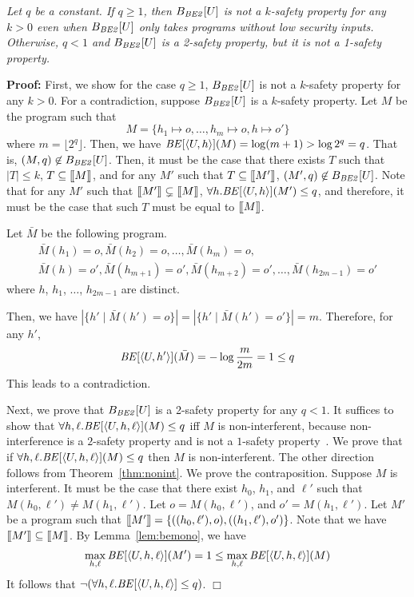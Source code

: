 \documentclass{llncs}
\newenvironment{proof}{\noindent\rm{\bf Proof:}}{\hbox{$\Box$}\vspace*{0.2\baselineskip}}
\newenvironment{reftheorem}[1]{\begin{trivlist}\item[\hskip
      \labelsep{\bf Theorem #1.}]\it}{\end{trivlist}}
\newcommand{\aset}[1]{\{{#1}\}}
\newcommand{\aseq}[1]{\langle#1\rangle}
\newcommand{\sembrack}[1]{[\hspace*{-1.2pt}[#1]\hspace*{-1.2pt}]}
\begin{document}
\begin{reftheorem}{\ref{thm:be2nk1}}
  Let $q$ be a constant.  If $q\ge 1$, then $B_{\it BE2}[U]$ is not a
  $k$-safety property for any $k > 0$ even when $B_{\it BE2}[U]$ only
  takes programs without low security inputs.  Otherwise, $q<1$ and
  $B_{\it BE2}[U]$ is a 2-safety property, but it is not a 1-safety
  property.
\end{reftheorem}
\begin{proof}
First, we show for the case $q \geq 1$, $B_{\it BE2}[U]$ is not a
$k$-safety property for any $k > 0$.  For a contradiction, suppose
$B_{\it BE2}[U]$ is a $k$-safety property.  Let $M$ be the program such
that
\[
M = \aset{h_1 \mapsto o,\dots, h_m \mapsto o,h \mapsto o'}
\]
where $m=\lfloor 2^q\rfloor$.  Then, we have ${\it
  BE}[\aseq{U,h}](M)=\log(m+1)>\log 2^q=q$.  That is, $(M,q)\not\in
B_{\it BE2}[U]$.  Then, it must be the case that there exists $T$ such
that $|T|\le k$, $T\subseteq\sembrack{M}$, and for any $M'$ such that
$T\subseteq \sembrack{M'}$, $(M',q)\not\in B_{\it BE2}[U]$.  Note that
for any $M'$ such that $\sembrack{M'} \subsetneq \sembrack{M}$,
$\forall h.{\it BE}[\aseq{U,h}](M') \leq q$, and therefore, it must be
the case that such $T$ must be equal to $\sembrack{M}$.

Let $\bar{M}$ be the following program.
\[
\begin{array}{l}
  \bar{M}(h_1)=o,
  \bar{M}(h_2)=o,
  \dots,
  \bar{M}(h_m)=o,\\
  \bar{M}(h)=o', \bar{M}(h_{m+1})=o',
  \bar{M}(h_{m+2})=o',
\dots,
  \bar{M}(h_{2m-1})=o'
\end{array}
\]
where $h$, $h_1$, $\dots$, $h_{2m-1}$ are distinct.

Then, we have $|\aset{h'\mid \bar{M}(h')=o}|=|\aset{h'\mid
  \bar{M}(h')=o'}|=m$.  Therefore, for any $h'$,
\[
{\it BE}[\aseq{U,h'}](\bar{M})=-\log\frac{m}{2m}=1\le q
\]
This leads to a contradiction.

Next, we prove that $B_{\it BE2}[U]$ is a 2-safety property for any
$q<1$.  It suffices to show that $\forall h,\ell.{\it
  BE}[\aseq{U,h,\ell}](M)\le q$ iff $M$ is non-interferent, because
non-interference is a $2$-safety property and is not a $1$-safety
property~\cite{mclean:sp94,barthe:csfw04,darvas:spc05}.  We prove that
if $\forall h,\ell.{\it BE}[\aseq{U,h,\ell}](M)\le q$ then $M$ is
non-interferent.  The other direction follows from
Theorem~\ref{thm:nonint}.  We prove the contraposition.  Suppose $M$
is interferent.  It must be the case that there exist $h_0$, $h_1$,
and $\ell'$ such that $M(h_0,\ell')\not=M(h_1,\ell')$.  Let
$o=M(h_0,\ell')$, and $o'=M(h_1,\ell')$.  Let $M'$ be a program such
that $\sembrack{M'}=\aset{((h_0,\ell'),o),((h_1,\ell'),o')}$.  Note
that we have $\sembrack{M'}\subseteq\sembrack{M}$.  By
Lemma~\ref{lem:bemono}, we have
\[
\max_{h,\ell} {\it BE}[\aseq{U,h,\ell}](M')=1\le \max_{h,\ell} {\it BE}[\aseq{U,h,\ell}](M)
\] 
It follows that $\neg(\forall h,\ell.{\it BE}[\aseq{U,h,\ell}] \le
q)$.
\end{proof}
\end{document}
